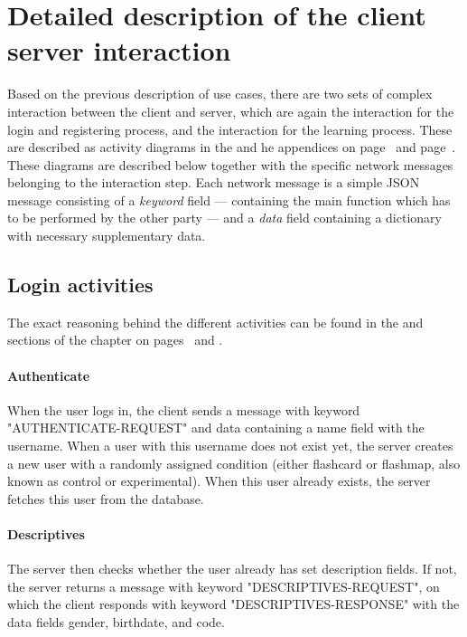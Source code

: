 \section{Detailed description of the client server interaction}

Based on the previous description of use cases, there are two sets of complex interaction between the client and server, which are again the interaction for the login and registering process, and the interaction for the learning process. These are described as activity diagrams in the  and he  appendices on page~\pageref{app:loginactivity} and page~\pageref{app:learningactivity}. These diagrams are described below together with the specific network messages belonging to the interaction step. Each network message is a simple JSON message consisting of a \emph{keyword} field --- containing the main function which has to be performed by the other party --- and a \emph{data} field containing a dictionary with necessary supplementary data.

\subsection{Login activities}

The exact reasoning behind the different activities can be found in the  and  sections of the  chapter on pages~\pageref{sec:procedure} and \pageref{sec:instrumentation}.

\paragraph{Authenticate} When the user logs in, the client sends a message with keyword "AUTHENTICATE-REQUEST" and data containing a name field with the username. When a user with this username does not exist yet, the server creates a new user with a randomly assigned condition (either flashcard or flashmap, also known as control or experimental). When this user already exists, the server fetches this user from the database.

\paragraph{Descriptives} The server then checks whether the user already has set description fields. If not, the server returns a message with keyword "DESCRIPTIVES-REQUEST", on which the client responds with keyword "DESCRIPTIVES-RESPONSE" with the data fields gender, birthdate, and code.

